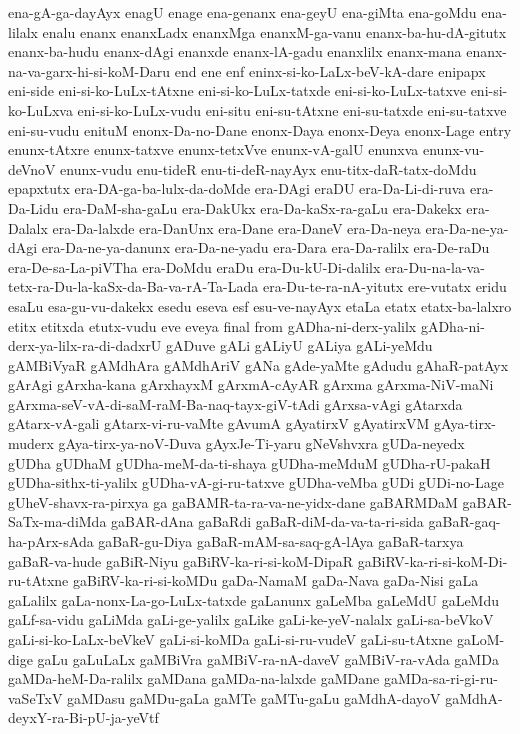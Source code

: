 {ena-gA-ga-dayAyx
enagU
enage
ena-genanx
ena-geyU
ena-giMta
ena-goMdu
ena-lilalx
enalu
enanx
enanxLadx
enanxMga
enanxM-ga-vanu
enanx-ba-hu-dA-gitutx
enanx-ba-hudu
enanx-dAgi
enanxde
enanx-lA-gadu
enanxlilx
enanx-mana
enanx-na-va-garx-hi-si-koM-Daru
end
ene
enf
eninx-si-ko-LaLx-beV-kA-dare
enipapx
eni-side
eni-si-ko-LuLx-tAtxne
eni-si-ko-LuLx-tatxde
eni-si-ko-LuLx-tatxve
eni-si-ko-LuLxva
eni-si-ko-LuLx-vudu
eni-situ
eni-su-tAtxne
eni-su-tatxde
eni-su-tatxve
eni-su-vudu
enituM
enonx-Da-no-Dane
enonx-Daya
enonx-Deya
enonx-Lage
entry
enunx-tAtxre
enunx-tatxve
enunx-tetxVve
enunx-vA-galU
enunxva
enunx-vu-deVnoV
enunx-vudu
enu-tideR
enu-ti-deR-nayAyx
enu-titx-daR-tatx-doMdu
epapxtutx
era-DA-ga-ba-lulx-da-doMde
era-DAgi
eraDU
era-Da-Li-di-ruva
era-Da-Lidu
era-DaM-sha-gaLu
era-DakUkx
era-Da-kaSx-ra-gaLu
era-Dakekx
era-Dalalx
era-Da-lalxde
era-DanUnx
era-Dane
era-DaneV
era-Da-neya
era-Da-ne-ya-dAgi
era-Da-ne-ya-danunx
era-Da-ne-yadu
era-Dara
era-Da-ralilx
era-De-raDu
era-De-sa-La-piVTha
era-DoMdu
eraDu
era-Du-kU-Di-dalilx
era-Du-na-la-va-tetx-ra-Du-la-kaSx-da-Ba-va-rA-Ta-Lada
era-Du-te-ra-nA-yitutx
ere-vutatx
eridu
esaLu
esa-gu-vu-dakekx
esedu
eseva
esf
esu-ve-nayAyx
etaLa
etatx
etatx-ba-lalxro
etitx
etitxda
etutx-vudu
eve
eveya
final
from
gADha-ni-derx-yalilx
gADha-ni-derx-ya-lilx-ra-di-dadxrU
gADuve
gALi
gALiyU
gALiya
gALi-yeMdu
gAMBiVyaR
gAMdhAra
gAMdhAriV
gANa
gAde-yaMte
gAdudu
gAhaR-patAyx
gArAgi
gArxha-kana
gArxhayxM
gArxmA-cAyAR
gArxma
gArxma-NiV-maNi
gArxma-seV-vA-di-saM-raM-Ba-naq-tayx-giV-tAdi
gArxsa-vAgi
gAtarxda
gAtarx-vA-gali
gAtarx-vi-ru-vaMte
gAvumA
gAyatirxV
gAyatirxVM
gAya-tirx-muderx
gAya-tirx-ya-noV-Duva
gAyxJe-Ti-yaru
gNeVshvxra
gUDa-neyedx
gUDha
gUDhaM
gUDha-meM-da-ti-shaya
gUDha-meMduM
gUDha-rU-pakaH
gUDha-sithx-ti-yalilx
gUDha-vA-gi-ru-tatxve
gUDha-veMba
gUDi
gUDi-no-Lage
gUheV-shavx-ra-pirxya
ga
gaBAMR-ta-ra-va-ne-yidx-dane
gaBARMDaM
gaBAR-SaTx-ma-diMda
gaBAR-dAna
gaBaRdi
gaBaR-diM-da-va-ta-ri-sida
gaBaR-gaq-ha-pArx-sAda
gaBaR-gu-Diya
gaBaR-mAM-sa-saq-gA-lAya
gaBaR-tarxya
gaBaR-va-hude
gaBiR-Niyu
gaBiRV-ka-ri-si-koM-DipaR
gaBiRV-ka-ri-si-koM-Di-ru-tAtxne
gaBiRV-ka-ri-si-koMDu
gaDa-NamaM
gaDa-Nava
gaDa-Nisi
gaLa
gaLalilx
gaLa-nonx-La-go-LuLx-tatxde
gaLanunx
gaLeMba
gaLeMdU
gaLeMdu
gaLf-sa-vidu
gaLiMda
gaLi-ge-yalilx
gaLike
gaLi-ke-yeV-nalalx
gaLi-sa-beVkoV
gaLi-si-ko-LaLx-beVkeV
gaLi-si-koMDa
gaLi-si-ru-vudeV
gaLi-su-tAtxne
gaLoM-dige
gaLu
gaLuLaLx
gaMBiVra
gaMBiV-ra-nA-daveV
gaMBiV-ra-vAda
gaMDa
gaMDa-heM-Da-ralilx
gaMDana
gaMDa-na-lalxde
gaMDane
gaMDa-sa-ri-gi-ru-vaSeTxV
gaMDasu
gaMDu-gaLa
gaMTe
gaMTu-gaLu
gaMdhA-dayoV
gaMdhA-deyxY-ra-Bi-pU-ja-yeVtf
}
